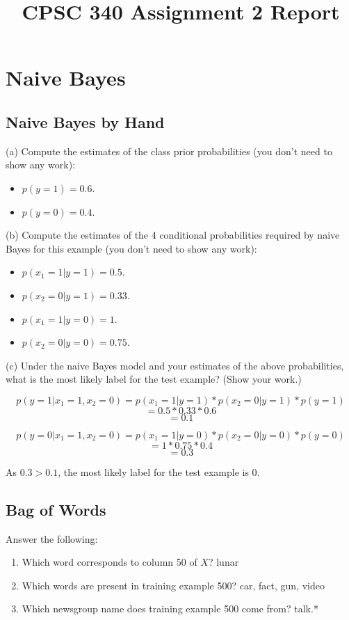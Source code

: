 \documentclass{article}
\def\blu#1{{\color{blu}#1}}
\def\items#1{\begin{itemize}#1\end{itemize}}
\def\enum#1{\begin{enumerate}#1\end{enumerate}}
\begin{document}
\title{CPSC 340 Assignment 2 Report}
\author{}
\date{}
\maketitle
\vspace{-4em}

\section{Naive Bayes}

\subsection{Naive Bayes by Hand}

\blu{(a) Compute the estimates of the class prior probabilities} (you don't need to show any work):
\items{
\item $p(y = 1) = 0.6$.
\item $p(y = 0) = 0.4$. 
}

\blu{(b) Compute the estimates of the 4 conditional probabilities required by naive Bayes for this example}  (you don't need to show any work):
\items{
\item $p(x_1 = 1 | y = 1) = 0.5$.
\item $p(x_2 = 0 | y = 1) = 0.33$.
\item $p(x_1 = 1 | y = 0) = 1$.
\item $p(x_2 = 0 | y = 0) = 0.75$.
}

\blu{(c) Under the naive Bayes model and your estimates of the above probabilities, what is the most likely label for the test example? (Show your work.)}

$$p(y = 1 | x_1 = 1, x_2 = 0) = p(x_1 = 1 | y = 1) * p(x_2 = 0 | y = 1) * p(y = 1)$$
$$= 0.5 * 0.33 * 0.6$$
$$= 0.1$$

$$p(y = 0 | x_1 = 1, x_2 = 0) = p(x_1 = 1 | y = 0) * p(x_2 = 0 | y = 0) * p(y = 0)$$
$$= 1 * 0.75 * 0.4$$
$$= 0.3$$

As $0.3 > 0.1$, the most likely label for the test example is $0$.


\subsection{Bag of Words}

\blu{Answer the following}:
\enum{
\item Which word corresponds to column 50 of $X$? lunar
\item Which words are present in training example 500? car, fact, gun, video
\item Which newsgroup name does training example 500 come from? talk.*
}
\end{document}
